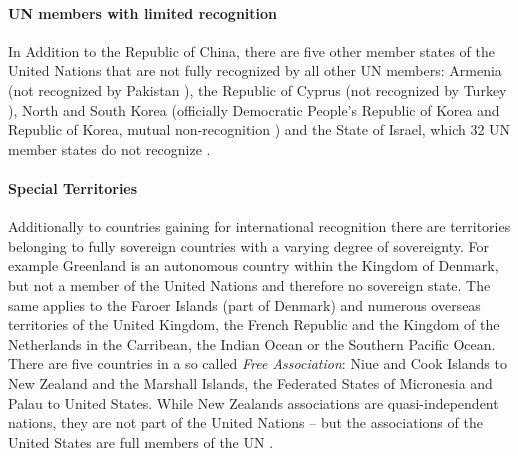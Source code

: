 
\paragraph{UN members with limited recognition} %
\label{par:un_members_with_limited_recognition}

In Addition to the Republic of China, there are five other member states of the United Nations that are not fully recognized by all other UN members: Armenia (not recognized by Pakistan \cite{ArmeniaRecognition}), the Republic of Cyprus (not recognized by Turkey \cite{CyprusRecognition}), North and South Korea (officially Democratic People's Republic of Korea and Republic of Korea, mutual non-recognition \cite{KoreaRecognition}) and the State of Israel, which 32 UN member states do not recognize \cite{IsraelRecognition}.


\paragraph{Special Territories} %
\label{par:special_territories}

Additionally to countries gaining for international recognition there are territories belonging to fully sovereign countries with a varying degree of sovereignty. For example Greenland is an autonomous country within the Kingdom of Denmark, but not a member of the United Nations and therefore no sovereign state. The same applies to the Faroer Islands (part of Denmark) and numerous overseas territories of the United Kingdom, the French Republic and the Kingdom of the Netherlands in the Carribean, the Indian Ocean or the Southern Pacific Ocean. There are five countries in a so called \emph{Free Association}: Niue and Cook Islands to New Zealand and the Marshall Islands, the Federated States of Micronesia and Palau to United States. While New Zealands associations are quasi-independent nations, they are not part of the United Nations -- but the associations of the United States are full members of the UN \cite{SpecialTerritories}.



